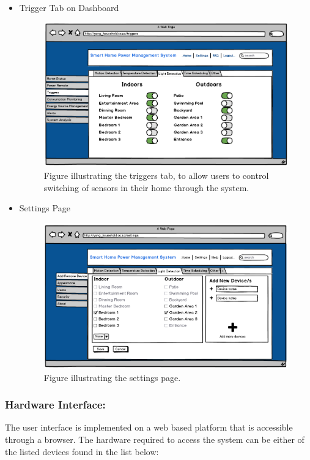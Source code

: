 \documentclass[10pt,twocolumn]{witseiepaper}
\begin{document}
\begin{itemize}
		\item Trigger Tab on Dashboard
		\begin{figure}[!h]
			\centering
			\includegraphics[width=\linewidth]{Trigger_Tab.png}
			\caption{Figure illustrating the triggers tab, to allow users to control switching of sensors in their home through the system.}
			\label{Trigger_Tab}
		\end{figure}
		\newpage
		\item Settings Page
		\begin{figure}[!h]
			\centering
			\includegraphics[width=\linewidth]{Settings.png}
			\caption{Figure illustrating the settings page.}
			\label{Settings}
		\end{figure}
	\end{itemize}
	
	\subsubsection{Hardware Interface:}
	The user interface is implemented on a web based platform that is accessible through a browser. The hardware required to access the system can be either of the listed devices found in the list below:
	
\end{document}
